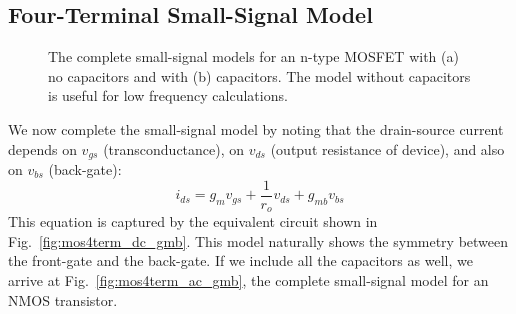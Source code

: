 \subsection{Four-Terminal Small-Signal Model}
\begin{figure}[tb]
\begin{center}
\end{center}
\caption{The complete small-signal models for an n-type MOSFET with (a) no capacitors and with (b) capacitors.  The model without capacitors is useful for low frequency calculations.} 
\end{figure}

We now complete the small-signal model by noting that the drain-source current depends on $v_{gs}$ (transconductance), on $v_{ds}$ (output resistance of device), and also on $v_{bs}$ (back-gate):
\begin{equation}
	{i_{ds}} = {g_m}{v_{gs}} +  \frac{1}{{{r_o}}}{v_{ds}} + {g_{mb}}{v_{bs}} 
\end{equation}
This equation is captured by the equivalent circuit shown in Fig.~\ref{fig:mos4term_dc_gmb}.  This model naturally shows the symmetry between the front-gate and the back-gate.  If we include all the capacitors as well, we arrive at Fig.~\ref{fig:mos4term_ac_gmb}, the complete small-signal model for an NMOS transistor.
